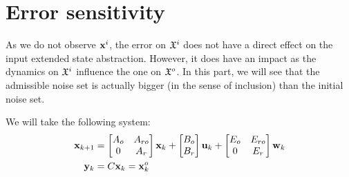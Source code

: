 \newcommand{\xo}{\vect{x}^o}%
\newcommand{\xr}{\vect{x}^r}%

\newcommand{\Ao}{A_o}%
\newcommand{\Ar}{A_r}%
\newcommand{\Aro}{A_{ro}}%

\newcommand{\Bo}{B_o}%
\newcommand{\Br}{B_r}%

\newcommand{\Eo}{E_o}%
\newcommand{\Er}{E_r}%
\newcommand{\Ero}{E_{ro}}%

\newcommand{\Xr}{X_r}%

\newcommand{\Xrinv}{\mathcal{X}_r}%
\newcommand{\xrinf}{\minf{\x}_r}%
\newcommand{\xrsup}{\msup{\x}_r}%


\newcommand{\Wsup}{\msup{W}}
\newcommand{\Winf}{\minf{W}}
\newcommand{\Wk}{W_k}

\renewcommand{\wr}{\vect{w}^r}
\newcommand{\wrsup}{\msup{\vect{w}}^r}
\newcommand{\wrinf}{\minf{\vect{w}}^r}
\newcommand{\Wrsup}{\msup{W}^r}
\newcommand{\Wrinf}{\minf{W}^r}
\newcommand{\Wrk}{W^r_k}

\newcommand{\z}{\vect{z}}%
\newcommand{\zk}{\z_k}%
\newcommand{\zkn}{\z_{k+1}}%

\newcommand{\xkn}{\x_{k+1}}%
\newcommand{\xk}{\x_{k}}%
\newcommand{\uk}{\u_{k}}%
\newcommand{\wk}{\w_{k}}%
\newcommand{\yk}{\y_{k}}%
\newcommand{\ykn}{\y_{k+1}}%

\newcommand{\Z}{\mathbf{z}}
\newcommand{\Zk}{\Z_k}
\newcommand{\Zkn}{\Z_{k+1}}
\newcommand{\hk}{\vect{h}_{k}}
\newcommand{\h}{\vect{h}}
\newcommand{\wnoise}{\msup{\sigma}}

\newcommand{\size}{N}
\newcommand{\norminf}[1]{\left\|#1\right\|_{\infty}}


\section{Error sensitivity}
%
%
As we do not observe $ \mathbf{x}^i$, the error on $\mathfrak{X}^i$ does not have a direct effect on the input extended state abstraction.
However, it does have an impact as the dynamics on $\mathfrak{X}^i$ influence the one on $\mathfrak{X}^o$.
In this part, we will see that the admissible noise set is actually bigger (in the sense of inclusion) than the initial noise set.

We will take the following system:
\begin{equation}
\begin{aligned}
\xkn &=
\begin{bmatrix} \Ao&\Aro\\ 0& \Ar \end{bmatrix} \xk + 
\begin{bmatrix} \Bo\\ \Br \end{bmatrix} \uk + 
\begin{bmatrix} \Eo & \Ero \\ 0 & \Er \end{bmatrix} \wk
\\
\yk &= C\xk = \xo_k
\end{aligned}
\end{equation}

